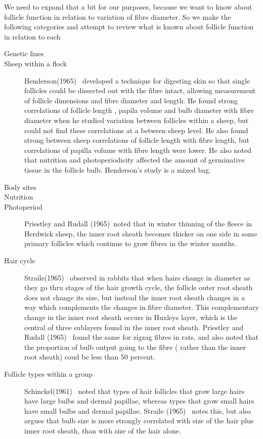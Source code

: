 \documentclass[titlepage]{article}  %
\begin{document}
We need to expand that a bit for our purposes, because we want to know about follicle function in relation to variation of fibre diameter. So we make the following categories and attempt to review what is known about follicle function in relation to each
\begin{description}
\item[Genetic lines]
\item[Sheep within a flock] Henderson(1965)~\cite{hend:65} developed a technique for digesting skin so that single follicles could be dissected out with the fibre intact, allowing measurement of follicle dimensions and fibre diameter and length. He found strong correlations of follicle length , papila volume and bulb diameter with fibre diameter when he studied variation between follicles within a sheep, but could not find these correlations at a between sheep level. He also found strong between sheep correlations of follicle length with fibre length, but correlations of papilla volume with fibre length were lower.  He also noted that nutrition and photoperiodicity affected the amount of germinative tissue in the follicle bulb. Henderson's study is a mixed bag.
\item[Body sites]
\item[Nutrition]
\item[Photoperiod] Priestley and Rudall (1965)~\cite{prie:65}noted that in winter thinning of the fleece in Herdwick sheep, the inner root sheath becomes thicker on one side in some primary follicles which continue to grow fibres in the winter months.
\item[Hair cycle] Straile(1965)~\cite{stra:65} observed in rabbits that when hairs change in diameter as they go thru stages of the hair growth cycle, the follicle outer root sheath does not change its size, but instead the inner root sheath changes in a way which complements the changes in fibre diameter. This complementary change in the inner root sheath occurs in Huxleys layer, which is the central of three sublayers found in the inner root sheath. 
Priestley and Rudall (1965)~\cite{prie:65} found the same for zigzag fibres in rats, and also noted that the proportion of bulb output going to the fibre ( rather than the inner root sheath) coud be less than 50 percent.
\item[Follicle types within a group] Schinckel(1961)~\cite{schi:61} noted that types of hair follicles that grow large hairs have large bulbs and dermal papillae, whereas types that grow small hairs have small bulbs and dermal papillae. Straile (1965)~\cite{stra:65} notes this, but also argues that bulb size is more strongly correlated with size of the hair plus inner root sheath, than with size of the hair alone.
\end{description}
\end{document}
